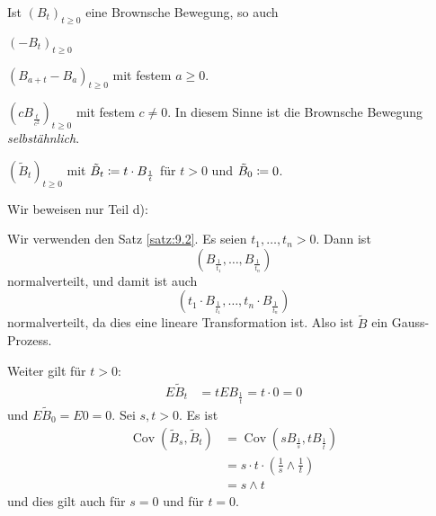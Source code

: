 \documentclass[a4paper,twoside,DIV15,BCOR12mm]{scrbook}
\begin{document}
\begin{satz}
\label{satz:9.3}
Ist $(B_t)_{t\ge0}$ eine Brownsche Bewegung, so auch
\begin{enuma}
\item $(-B_t)_{t\ge 0}$
\item $(B_{a+t}-B_a)_{t\ge 0}$ mit festem $a\ge 0$. 
\item $(cB_{\frac t{c^2}})_{t\ge 0}$ mit festem $c\ne 0$. In diesem Sinne ist die Brownsche Bewegung \emph{selbstähnlich}.
\item $(\tilde B_t)_{t\ge0}$ mit $\tilde B_t \da t \cdot B_{\frac 1t}$ für $t>0$ und $\tilde B_0\da 0$.
\end{enuma}
\end{satz}

\begin{beweis}
Wir beweisen nur Teil d):

Wir verwenden den Satz \ref{satz:9.2}. Es seien $t_1,\ldots,t_n>0$. Dann ist
\[
(B_{\frac 1 {t_1}},\ldots,B_{\frac1{t_n}})
\]
normalverteilt, und damit ist auch
\[
(t_1\cdot B_{\frac 1 {t_1}},\ldots,t_n\cdot B_{\frac1{t_n}})
\]
normalverteilt, da dies eine lineare Transformation ist. Also ist $\tilde B$ ein Gauss-Prozess.

Weiter gilt für $t>0$:
\begin{align*}
E\tilde B_t &= t EB_{\frac 1 t} = t \cdot 0 = 0
\end{align*}
und $E\tilde B_0=E0=0$. Sei $s,t>0$. Es ist
\begin{align*}
\operatorname{Cov}(\tilde B_s, \tilde B_t) 
&= \operatorname{Cov}(sB_{\frac 1s}, tB_{\frac 1t}) \\
&= s\cdot t \cdot ( \frac 1s \wedge \frac1t) \\
&= s\wedge t
\end{align*}
und dies gilt auch für $s=0$ und für $t=0$.


\end{beweis}
\end{document}

